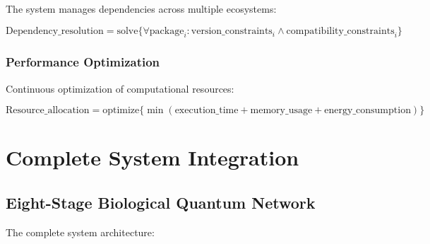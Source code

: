 \documentclass[11pt,a4paper]{article}
\begin{document}
The system manages dependencies across multiple ecosystems:

\begin{equation}
\text{Dependency\_resolution} = \text{solve}\{\forall \text{package}_i: \text{version\_constraints}_i \land \text{compatibility\_constraints}_i\}
\end{equation}

\subsubsection{Performance Optimization}

Continuous optimization of computational resources:

\begin{equation}
\text{Resource\_allocation} = \text{optimize}\{\min(\text{execution\_time} + \text{memory\_usage} + \text{energy\_consumption})\}
\end{equation}

\section{Complete System Integration}

\subsection{Eight-Stage Biological Quantum Network}

The complete system architecture:
\end{document}
